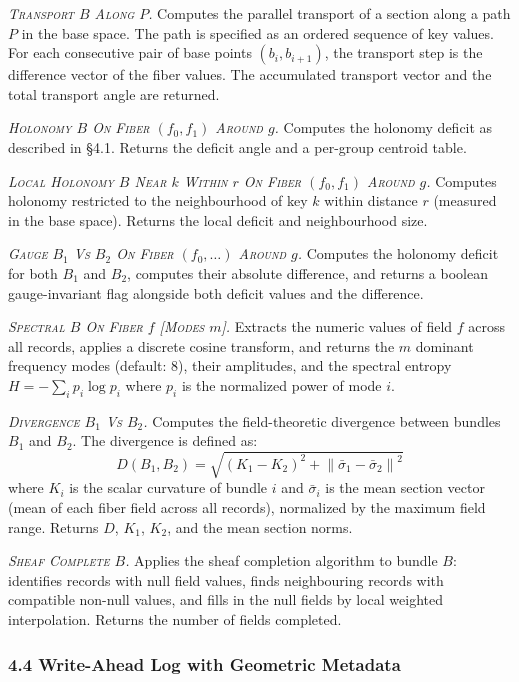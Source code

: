 \documentclass[11pt,letterpaper]{article}
\begin{document}
\textit{\textsc{Transport} $B$ \textsc{Along} $P$.} Computes the parallel transport of a section along a path $P$ in the base space. The path is specified as an ordered sequence of key values. For each consecutive pair of base points $(b_i, b_{i+1})$, the transport step is the difference vector of the fiber values. The accumulated transport vector and the total transport angle are returned.

\textit{\textsc{Holonomy} $B$ \textsc{On Fiber} $(f_0, f_1)$ \textsc{Around} $g$.} Computes the holonomy deficit as described in \S4.1. Returns the deficit angle and a per-group centroid table.

\textit{\textsc{Local Holonomy} $B$ \textsc{Near} $k$ \textsc{Within} $r$ \textsc{On Fiber} $(f_0, f_1)$ \textsc{Around} $g$.} Computes holonomy restricted to the neighbourhood of key $k$ within distance $r$ (measured in the base space). Returns the local deficit and neighbourhood size.

\textit{\textsc{Gauge} $B_1$ \textsc{Vs} $B_2$ \textsc{On Fiber} $(f_0, \ldots)$ \textsc{Around} $g$.} Computes the holonomy deficit for both $B_1$ and $B_2$, computes their absolute difference, and returns a boolean gauge-invariant flag alongside both deficit values and the difference.

\textit{\textsc{Spectral} $B$ \textsc{On Fiber} $f$ [\textsc{Modes} $m$].} Extracts the numeric values of field $f$ across all records, applies a discrete cosine transform, and returns the $m$ dominant frequency modes (default: 8), their amplitudes, and the spectral entropy $H = -\sum_i p_i \log p_i$ where $p_i$ is the normalized power of mode $i$.

\textit{\textsc{Divergence} $B_1$ \textsc{Vs} $B_2$.} Computes the field-theoretic divergence between bundles $B_1$ and $B_2$. The divergence is defined as:
\[
D(B_1, B_2) = \sqrt{(K_1 - K_2)^2 + \left\| \bar{\sigma}_1 - \bar{\sigma}_2 \right\|^2}
\]
where $K_i$ is the scalar curvature of bundle $i$ and $\bar{\sigma}_i$ is the mean section vector (mean of each fiber field across all records), normalized by the maximum field range. Returns $D$, $K_1$, $K_2$, and the mean section norms.

\textit{\textsc{Sheaf Complete} $B$.} Applies the sheaf completion algorithm to bundle $B$: identifies records with null field values, finds neighbouring records with compatible non-null values, and fills in the null fields by local weighted interpolation. Returns the number of fields completed.


\subsubsection*{4.4 Write-Ahead Log with Geometric Metadata}
\end{document}
